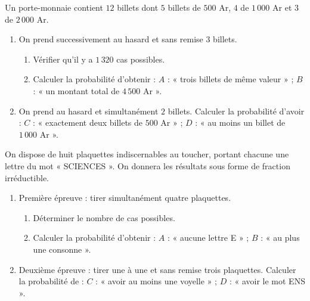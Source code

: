 \begin{annales}
Un porte-monnaie contient $12$ billets dont $5$ billets de $500$ Ar, $4$ de
$1\,000$ Ar et $3$ de $2\,000$ Ar.
\begin{enumerate}[label=\textbf{\arabic*)}, leftmargin=*, itemsep=0.15em]
  \item On prend successivement au hasard et sans remise $3$ billets.
        \begin{enumerate}[label=\textbf{\alph*)}, leftmargin=1.4em]
          \item Vérifier qu'il y a $1\,320$ cas possibles.
          \item Calculer la probabilité d'obtenir :
                $A$ : « trois billets de même valeur » ;
                $B$ : « un montant total de $4\,500$ Ar ».
        \end{enumerate}
  \item On prend au hasard et simultanément $2$ billets. Calculer la
        probabilité d'avoir :
        $C$ : « exactement deux billets de $500$ Ar » ;
        $D$ : « au moins un billet de $1\,000$ Ar ».
\end{enumerate}

On dispose de huit plaquettes indiscernables au toucher, portant chacune une
lettre du mot « SCIENCES ». On donnera les résultats sous forme de fraction
irréductible.
\begin{enumerate}[label=\textbf{\arabic*)}, leftmargin=*, itemsep=0.15em]
  \item Première épreuve : tirer simultanément quatre plaquettes.
        \begin{enumerate}[label=\textbf{\alph*)}, leftmargin=1.4em]
          \item Déterminer le nombre de cas possibles.
          \item Calculer la probabilité d'obtenir : $A$ : « aucune lettre
                E » ; $B$ : « au plus une consonne ».
        \end{enumerate}
  \item Deuxième épreuve : tirer une à une et sans remise trois plaquettes.
        Calculer la probabilité de : $C$ : « avoir au moins une voyelle » ;
        $D$ : « avoir le mot ENS ».
\end{enumerate}
\end{annales}

